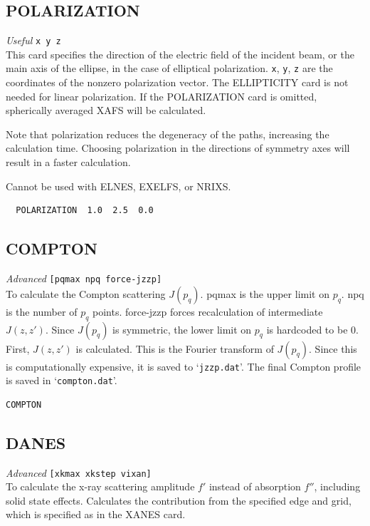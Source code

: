 \documentclass[11pt,oneside]{report} %
\renewcommand{\htmlref}[2]{\hyperlink{#2}{#1}}
\newenvironment{Card}[4]%
      {\vspace{3ex}%
        \subsection{#1}
        \quad\textsl{#3}\newline
        \quad\texttt{#2}\newline%
        \label{card:#4}\\}
      {}
\newcommand{\file}[1]{`\texttt{#1}'}
\renewcommand{\htmlref}[2]{{#1}} %
\begin{document}
\begin{Card}{POLARIZATION}{x y z}{Useful}{pol}
  This card specifies the direction of the electric field of the
  incident beam, or the main axis of the ellipse, in the case of
  elliptical polarization. \texttt{x}, \texttt{y}, \texttt{z} are the
  coordinates of the nonzero polarization vector. The \htmlref{ELLIPTICITY}{card:ell}
  card is not needed for linear polarization. If the POLARIZATION
  card is omitted, spherically averaged XAFS will be calculated.

  Note that polarization reduces the degeneracy of the paths,
  increasing the calculation time. Choosing polarization in the
  directions of symmetry axes will result in a faster calculation.
  
  Cannot be used with ELNES, EXELFS, or NRIXS.
\begin{verbatim}
  POLARIZATION  1.0  2.5  0.0
\end{verbatim}
\end{Card}


\begin{Card}{COMPTON}{[pqmax npq force-jzzp]}{Advanced}{com}
  To calculate the Compton scattering $J(p_q)$. pqmax is the upper limit on $p_q$.  npq is the number of $p_q$ points.  force-jzzp forces recalculation of intermediate $J(z,z')$.  Since $J(p_q)$ is symmetric, the lower limit on $p_q$ is hardcoded to be 0. 
  First, $J(z,z')$ is calculated.  This is the Fourier transform of $J(p_q)$.   Since this is computationally expensive, it is saved to \file{jzzp.dat}.  The final Compton profile is saved in \file{compton.dat}.
\begin{verbatim}
COMPTON
\end{verbatim}
\end{Card}



\begin{Card}{DANES}{[xkmax xkstep vixan]}{Advanced}{dan}
  To calculate the x-ray scattering amplitude $f'$ instead of absorption $f''$, 
  including solid state effects. Calculates the contribution from the specified
  edge and grid, which is specified as in the \htmlref{XANES}{card:xan} card.
\end{Card}
 
 
 
\end{document}

